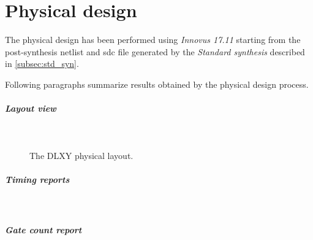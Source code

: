 \graphicspath{{./chapters/04-physical_design/figures/}}

\chapter{Physical design}
\label{chap:physical_design}
The physical design has been performed using \textit{Innovus 17.11} starting
from the post-synthesis netlist and sdc file generated by the \textit{Standard
synthesis} described in \ref{subsec:std_syn}.

\bigskip
Following paragraphs summarize results obtained by the physical design process.

\paragraph{Layout view} \mbox{} \\
\begin{figure}[H]
	\centering
	\label{fig:layout}
	\caption{The DLXY physical layout.}
\end{figure}

\paragraph{Timing reports} \mbox{} \\
\lstset{
	basicstyle=\tiny,
	frame=single,
	breaklines=true
}



\paragraph{Gate count report} \mbox{} \\


